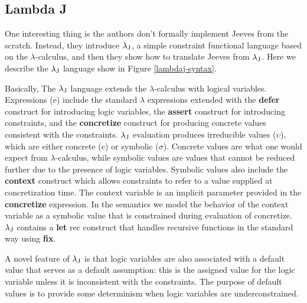 \subsection{Lambda J}
  One interesting thing is the authors don't formally implement Jeeves from the scratch. Instead, they introduce ${\lambda_{\text{J}}}$, a simple constraint functional language based on the {\ensuremath{\lambda}}-calculus, and then they show how to translate Jeeves from ${\lambda_{\text{J}}}$. Here we describe the ${\lambda_{\text{J}}}$ language show in Figure \ref{lambdaj-syntax}.

  Basically, The ${\lambda_{\text{J}}}$ language extends the {\ensuremath{\lambda}}-calculus with logical variables. Expressions (e) include the standard {\ensuremath{\lambda}} expressions extended with the \textbf{defer} construct for introducing logic variables, the \textbf{assert} construct for introducing constraints, and the \textbf{concretize} construct for producing concrete values consistent with the constraints. ${\lambda_{\text{J}}}$ evaluation produces irreducible values ($\upsilon$), which are either concrete (c) or symbolic ($\sigma$). Concrete values are what one would expect from {\ensuremath{\lambda}}-calculus, while symbolic values are values that cannot be reduced further due to the presence of logic variables. Symbolic values also include the \textbf{context} construct which allows constraints to refer to a value supplied at concretization time. The context variable is an implicit parameter provided in the \textbf{concretize} expression. In the semantics we model the behavior of the context variable as a symbolic value that is constrained during evaluation of concretize. ${\lambda_{\text{J}}}$ contains a \textbf{let} rec construct that handles recursive functions in the standard way using \textbf{fix}.

  A novel feature of ${\lambda_{\text{J}}}$ is that logic variables are also associated with a default value that serves as a default assumption: this is the assigned value for the logic variable unless it is inconsistent with the constraints. The purpose of default values is to provide some determinism when logic variables are underconstrained.

